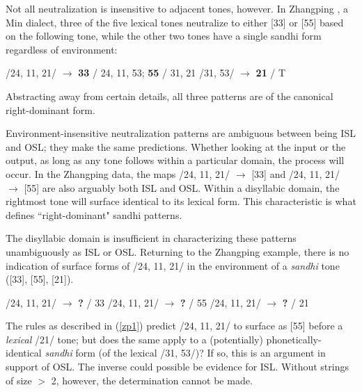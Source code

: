 \documentclass{article}
\begin{document}
\par
Not all neutralization is insensitive to adjacent tones, however. In Zhangping \cite{zhang1983}, a Min dialect, three of the five lexical tones neutralize to either [33] or [55] based on the following tone, while the other two tones have a single sandhi form regardless of environment:
\begin{exe}
\ex \label{zp1}
\begin{xlist}
	\ex /24, 11, 21/ $\rightarrow$ \textbf{33} / \underline{\hspace{1em}} 24, 11, 53; \textbf{55} / \underline{\hspace{1em}} 31, 21
	\ex /31, 53/ $\rightarrow$ \textbf{21} / \underline{\hspace{1em}} T
\end{xlist}
\end{exe}
Abstracting away from certain details, all three patterns are of the canonical right-dominant form. \par
Environment-insensitive neutralization patterns are ambiguous between being ISL and OSL; they make the same predictions. Whether looking at the input or the output, as long as any tone follows within a particular domain, the process will occur. In the Zhangping data, the maps /24, 11, 21/ $\rightarrow$ [33] and /24, 11, 21/ $\rightarrow$ [55] are also arguably both ISL and OSL. Within a disyllabic domain, the rightmost tone will surface identical to its lexical form. This characteristic is what defines ``right-dominant" sandhi patterns. \par
The disyllabic domain is insufficient in characterizing these patterns unambiguously as ISL or OSL. Returning to the Zhangping example, there is no indication of surface forms of /24, 11, 21/ in the environment of a \emph{sandhi} tone ([33], [55], [21]).
\begin{exe}
\ex
\begin{xlist}
	\ex /24, 11, 21/ $\rightarrow$ \textbf{?} / \underline{\hspace{1em}} 33
	\ex /24, 11, 21/ $\rightarrow$ \textbf{?} / \underline{\hspace{1em}} 55
	\ex /24, 11, 21/ $\rightarrow$ \textbf{?} / \underline{\hspace{1em}} 21
\end{xlist}
\end{exe}
The rules as described in (\ref{zp1}) predict /24, 11, 21/ to surface as [55] before a \emph{lexical} /21/ tone; but does the same apply to a (potentially) phonetically-identical \emph{sandhi} form (of the lexical /31, 53/)? If so, this is an argument in support of OSL. The inverse could possible be evidence for ISL. Without strings of size $>$ 2, however, the determination cannot be made.
\end{document}

